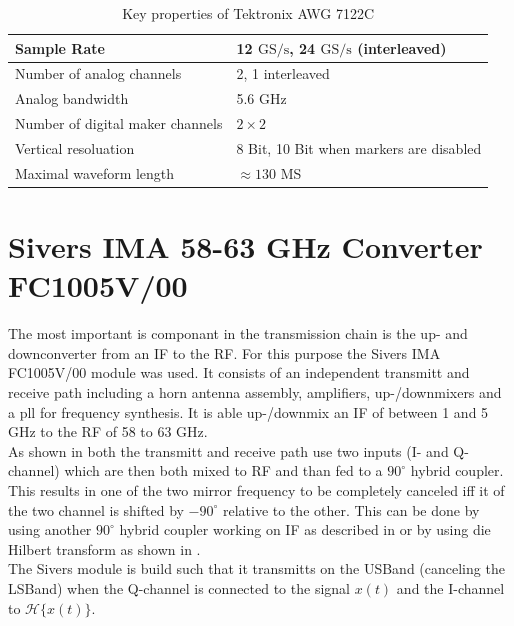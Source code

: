 \begin{table}[h]
  \centering
  \begin{tabular}{|l|l|}
    \hline
    Sample Rate & 12 $\text{GS}/\text{s}$, 24 $\text{GS}/\text{s}$ (interleaved) \\ \hline
    Number of analog channels & 2, 1 interleaved \\ \hline
    Analog bandwidth & 5.6 GHz \\ \hline
    Number of digital maker channels & $2 \times 2$ \\ \hline
    Vertical resoluation & 8 Bit, 10 Bit when markers are disabled \\ \hline
    Maximal waveform length & $\approx 130$ MS  \\ \hline
  \end{tabular}
  \caption{Key properties of Tektronix AWG 7122C}
  \label{tab:awg}
\end{table}

\section{Sivers IMA 58-63 GHz Converter FC1005V/00}
\label{sec:comp_sivers}
The most important is componant in the transmission chain is the
up- and downconverter from an \acrfull{IF} to the \acrfull{RF}.
For this purpose the Sivers IMA FC1005V/00 module was used.
It consists of an independent transmitt and receive path including
a horn antenna assembly, amplifiers, up-/downmixers and a pll
for frequency synthesis. It is able up-/downmix an \gls{IF}
of between 1 and 5 GHz to the \gls{RF} of 58 to 63 GHz. \\

As shown in  both the transmitt and receive path
use two inputs (I- and Q-channel) which are then both mixed to
\gls{RF} and than fed to a $90^\circ$ hybrid coupler. \\
This results in one of the two mirror frequency to be completely canceled
iff it of the two channel is shifted by $-90^\circ$ relative to the other.
This can be done by using another $90^\circ$ hybrid coupler working on
\gls{IF} as described in  or by using die Hilbert
transform as shown in . \\
The Sivers module is build such that it transmitts on the \gls{USBand}
(canceling the \gls{LSBand}) when the Q-channel is connected to the signal
$x(t)$ and the I-channel to $\mathcal{H}\{x(t)\}$.
 \\

